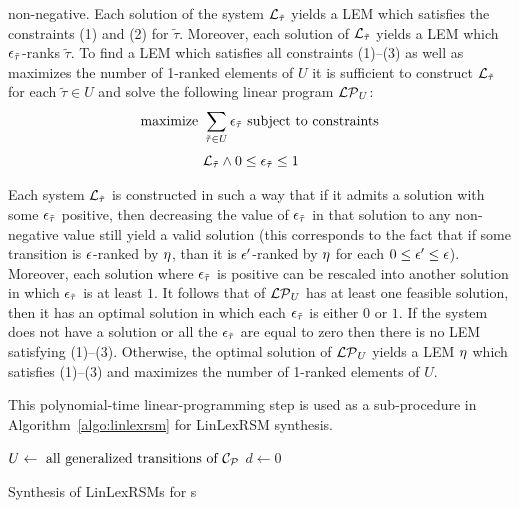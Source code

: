   non-negative. Each solution of the system $\mathcal{L}_{\tilde{\tau}}$ yields 
  a LEM which satisfies the constraints (1) and (2) for $\tilde{\tau}$. 
  Moreover, each solution of $\mathcal{L}_{\tilde{\tau}}$ yields a LEM which 
  $\epsilon_{\tilde{\tau}}$-ranks $\tilde{\tau}$. To find a LEM which satisfies all 
  constraints (1)--(3) as well as maximizes the number of 1-ranked elements of 
  $U$ it is sufficient to construct $\mathcal{L}_{\tilde{\tau}}$ for each 
  $\tilde{\tau}\in U$ and solve the following linear program $\mathcal{LP}_{U}$:
  \begin{align*}
\text{maximize }  &\sum_{\tilde{\tau} \in U} \epsilon_{\tilde\tau} \text{ subject 
to constraints}\\[0.1cm]
&\mathcal{L}_{\tilde{\tau}} \wedge 0 \leq \epsilon_{\tilde{\tau}} \leq 1
  \end{align*}
 \vspace{-0.6cm}
  
Each system $\mathcal{L}_{\tilde{\tau}}$ is constructed in such a way that if it 
admits a solution with some $\epsilon_{\tilde{\tau}}$ positive, then decreasing the 
value of $\epsilon_{\tilde{\tau}}$ in that solution to any non-negative value still 
yield a valid solution (this corresponds to the fact that if some transition is 
$\epsilon$-ranked by $\eta$, than it is $\epsilon'$-ranked by $\eta$ for each $0\leq 
\epsilon'\leq \epsilon$). Moreover, each solution where $\epsilon_{\tilde{\tau}}$ is 
positive can be rescaled into another solution in which $\epsilon_{\tilde{\tau}}$ 
is at least $1$. It follows that of $\mathcal{LP}_{U}$ has at least one feasible 
solution, then it has an optimal solution in which each $\epsilon_{\tilde{\tau}}$ 
is either $0$ or $1$. If the system does not have a solution or all the 
$\epsilon_{\tilde{\tau}}$ are equal to zero then there is no LEM satisfying 
(1)--(3). Otherwise, the optimal solution of $\mathcal{LP}_{U}$ yields a LEM $\eta$ 
which satisfies (1)--(3) and maximizes the number of 1-ranked elements of $U$.

This polynomial-time linear-programming step is used as a sub-procedure in Algorithm~\ref{algo:linlexrsm} for LinLexRSM synthesis. 

\begin{algorithm}
\DontPrintSemicolon

$U \leftarrow \text{ all generalized transitions of } \mathcal{C}_{\mathcal{P}}$\;
$d\leftarrow 0$\;
\caption{Synthesis of LinLexRSMs for \APP{}s}
\label{algo:linlexrsm}
\end{algorithm}

